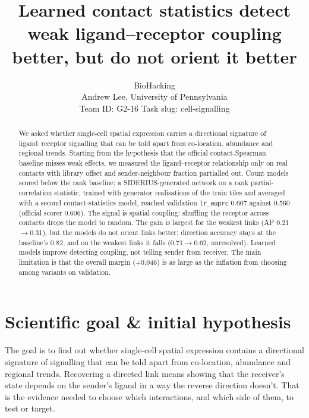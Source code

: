 \documentclass{article}
\title{Learned contact statistics detect weak ligand--receptor coupling better, but do not orient it better}
\author{BioHacking \\ Andrew Lee, University of Pennsylvania
\\ Team ID: G2-16 \quad Task slug: cell-signalling}
\begin{document}
\maketitle
\begin{abstract}
We asked whether single-cell spatial expression carries a directional signature of ligand--receptor signalling
that can be told apart from co-location, abundance and regional trends. Starting from the hypothesis that the
official contact-Spearman baseline misses weak effects, we measured the ligand--receptor relationship only on real
contacts with library offset and sender-neighbour fraction partialled out. Count models scored below the rank
baseline; a SIDERIUS-generated network on a rank partial-correlation statistic, trained with generator
realisations of the train tiles and averaged with a second contact-statistics model, reached validation
\texttt{lr\_auprc} 0.607 against 0.560 (official scorer 0.606). The signal is spatial coupling: shuffling the receptor
across contacts drops the model to random. The gain is largest for the weakest links (AP 0.21$\to$0.31), but the
models do not orient links better: direction accuracy stays at the baseline's 0.82, and on the weakest links it
falls (0.71$\to$0.62, unresolved). Learned models improve detecting coupling, not telling sender from receiver. The
main limitation is that the overall margin (+0.046) is as large as the inflation from choosing among variants on
validation.
\end{abstract}

\section{Scientific goal \& initial hypothesis}
The goal is to find out whether single-cell spatial expression contains a directional signature of signalling
that can be told apart from co-location, abundance and regional trends. Recovering a directed link means showing
that the receiver's state depends on the sender's ligand in a way the reverse direction doesn't. That is the
evidence needed to choose which interactions, and which side of them, to test or target.
\end{document}
